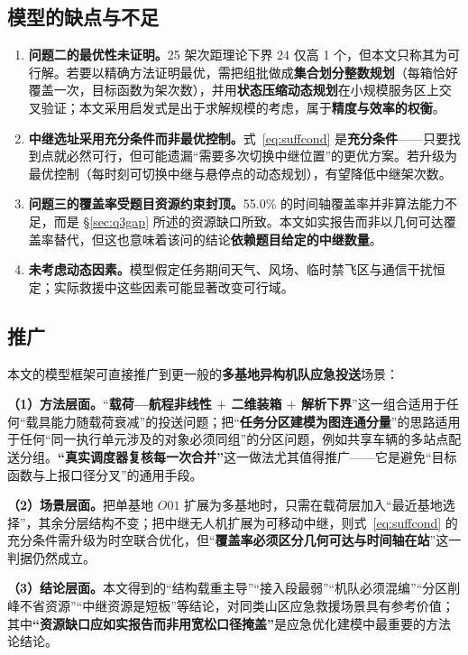 \subsection{模型的缺点与不足}

\begin{enumerate}[label=\textbf{不足 \arabic*}]
	\item \textbf{问题二的最优性未证明。}25 架次距理论下界 24 仅高 1 个，但本文只称其为可行解。若要以精确方法证明最优，需把组批做成\textbf{集合划分整数规划}（每箱恰好覆盖一次，目标函数为架次数），并用\textbf{状态压缩动态规划}在小规模服务区上交叉验证；本文采用启发式是出于求解规模的考虑，属于\textbf{精度与效率的权衡}。

	\item \textbf{中继选址采用充分条件而非最优控制。}式~\eqref{eq:suffcond} 是\textbf{充分条件}——只要找到点就必然可行，但可能遗漏“需要多次切换中继位置”的更优方案。若升级为最优控制（每时刻可切换中继与悬停点的动态规划），有望降低中继架次数。

	\item \textbf{问题三的覆盖率受题目资源约束封顶。}55.0\% 的时间轴覆盖率并非算法能力不足，而是 \S\ref{sec:q3gap} 所述的资源缺口所致。本文如实报告而非以几何可达覆盖率替代，但这也意味着该问的结论\textbf{依赖题目给定的中继数量}。

	\item \textbf{未考虑动态因素。}模型假定任务期间天气、风场、临时禁飞区与通信干扰恒定；实际救援中这些因素可能显著改变可行域。
\end{enumerate}

\subsection{推广}

本文的模型框架可直接推广到更一般的\textbf{多基地异构机队应急投送}场景：

\textbf{（1）方法层面。}“\textbf{载荷—航程非线性 $+$ 二维装箱 $+$ 解析下界}”这一组合适用于任何“载具能力随载荷衰减”的投送问题；把“\textbf{任务分区建模为图连通分量}”的思路适用于任何“同一执行单元涉及的对象必须同组”的分区问题，例如共享车辆的多站点配送分组。\textbf{“真实调度器复核每一次合并”}这一做法尤其值得推广——它是避免“目标函数与上报口径分叉”的通用手段。

\textbf{（2）场景层面。}把单基地 $O01$ 扩展为多基地时，只需在载荷层加入“最近基地选择”，其余分层结构不变；把中继无人机扩展为可移动中继，则式~\eqref{eq:suffcond} 的充分条件需升级为时空联合优化，但“\textbf{覆盖率必须区分几何可达与时间轴在站}”这一判据仍然成立。

\textbf{（3）结论层面。}本文得到的“结构载重主导”“接入段最弱”“机队必须混编”“分区削峰不省资源”“中继资源是短板”等结论，对同类山区应急救援场景具有参考价值；其中\textbf{“资源缺口应如实报告而非用宽松口径掩盖”}是应急优化建模中最重要的方法论结论。
